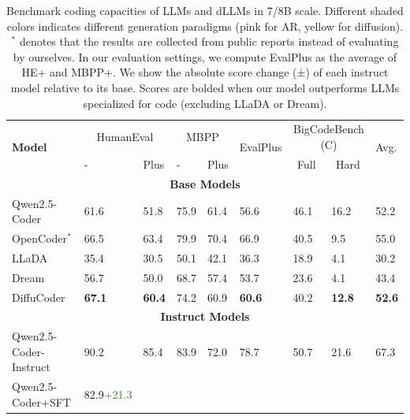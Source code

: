 \begin{table}[t]
    \centering
    \small
    \setlength{\tabcolsep}{4pt} 
    \caption{Benchmark coding capacities of LLMs and dLLMs in 7/8B scale. Different shaded colors indicates different generation paradigms (pink for AR, yellow for diffusion). $^*$ denotes that the results are collected from public reports instead of evaluating by ourselves. In our evaluation settings, we compute EvalPlus as the average of HE+ and MBPP+. We show the absolute score change (±) of each instruct model relative to its base. Scores are bolded when our model outperforms LLMs specialized for code (excluding LLaDA or Dream).}
    \begin{tabular}{@{} l ll ll l ll l @{}}
        \toprule
        \multirow{2}{*}{\textbf{Model}}
            & \multicolumn{2}{c}{HumanEval}
            & \multicolumn{2}{c}{MBPP}
            & \multirow{2}{*}{EvalPlus}
            & \multicolumn{2}{c}{BigCodeBench (C)} 
            & \multirow{2}{*}{Avg.}\\
        \cmidrule(lr){2-3} \cmidrule(lr){4-5} \cmidrule(lr){7-8}
            & -   & Plus
            & -   & Plus
            & 
            & \multicolumn{1}{c}{Full} & \multicolumn{1}{c}{Hard} & \\
        \midrule
        \multicolumn{9}{c}{\textbf{Base Models}} \\
        \midrule
        \cellcolor{lightRed!12}Qwen2.5-Coder      & 61.6  & 51.8  & 75.9  & 61.4  & 56.6  & 46.1  & 16.2  &52.2 \\
        \cellcolor{lightRed!12}OpenCoder$^*$      & 66.5  & 63.4  & 79.9  & 70.4  & 66.9  & 40.5  & 9.5  & 55.0 \\
        \cellcolor{lightYellow!12}LLaDA         & 35.4  & 30.5  & 50.1  & 42.1  & 36.3  & 18.9  & 4.1  & 30.2 \\
        \cellcolor{lightYellow!12}Dream         & 56.7  & 50.0  & 68.7  & 57.4  & 53.7  & 23.6  & 4.1  & 43.4\\
        \cellcolor{lightYellow!12}DiffuCoder            & \textbf{67.1}  & \textbf{60.4}  & 74.2  & 60.9  & \textbf{60.6}  & 40.2  & \textbf{12.8}  & \textbf{52.6} \\
        \midrule
        \multicolumn{9}{c}{\textbf{Instruct Models}} \\
        \midrule
        \cellcolor{lightRed!12}Qwen2.5-Coder-Instruct & 90.2  & 85.4  & 83.9  & 72.0  & 78.7  & 50.7  & 21.6  & 67.3 \\
        \cellcolor{lightRed!12}Qwen2.5-Coder+SFT      
        & 82.9{\tiny\textcolor{ForestGreen}{+21.3}}  

\end{tabular}
\end{table}
